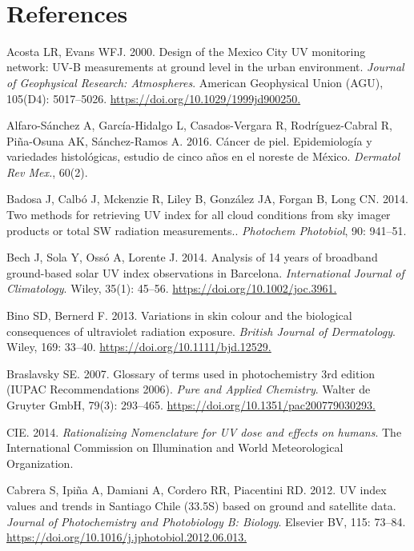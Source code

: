 \documentclass[10pt]{article}
\begin{document}
~

\FloatBarrier
\section*{References}\sloppy
{}
\label{csl:18}Acosta LR, Evans WFJ. 2000. {Design of the Mexico City {UV} monitoring network: {UV}-B measurements at ground level in the urban environment}. \textit{Journal of Geophysical Research: Atmospheres}. American Geophysical Union ({AGU}), 105(D4): 5017–5026. \url{https://doi.org/10.1029/1999jd900250.}

\label{csl:74}Alfaro-Sánchez A, García-Hidalgo L, Casados-Vergara R, Rodríguez-Cabral R, Piña-Osuna AK, Sánchez-Ramos A. 2016. {Cáncer de piel. Epidemiología y variedades histológicas, estudio de cinco años en el noreste de México}. \textit{Dermatol Rev Mex.}, 60(2).

\label{csl:69}Badosa J, Calbó J, Mckenzie R, Liley B, González JA, Forgan B, Long CN. 2014. {Two methods for retrieving UV index for all cloud conditions from sky imager products or total SW radiation measurements.}. \textit{Photochem Photobiol}, 90: 941–51.

\label{csl:59}Bech J, Sola Y, Oss{\'{o}} A, Lorente J. 2014. {Analysis of 14 years of broadband ground-based solar {UV} index observations in Barcelona}. \textit{International Journal of Climatology}. Wiley, 35(1): 45–56. \url{https://doi.org/10.1002/joc.3961.}

\label{csl:43}Bino SD, Bernerd F. 2013. {Variations in skin colour and the biological consequences of ultraviolet radiation exposure}. \textit{British Journal of Dermatology}. Wiley, 169: 33–40. \url{https://doi.org/10.1111/bjd.12529.}

\label{csl:29}Braslavsky SE. 2007. {Glossary of terms used in photochemistry 3rd edition ({IUPAC} Recommendations 2006)}. \textit{Pure and Applied Chemistry}. Walter de Gruyter {GmbH}, 79(3): 293–465. \url{https://doi.org/10.1351/pac200779030293.}

\label{csl:23}CIE. 2014. \textit{{Rationalizing Nomenclature for UV dose and effects on humans}}. The International Commission on Illumination and World Meteorological Organization.

\label{csl:71}Cabrera S, Ipi{\~{n}}a A, Damiani A, Cordero RR, Piacentini RD. 2012. {{UV} index values and trends in Santiago Chile (33.5{\textdegree}S) based on ground and satellite data}. \textit{Journal of Photochemistry and Photobiology B: Biology}. Elsevier {BV}, 115: 73–84. \url{https://doi.org/10.1016/j.jphotobiol.2012.06.013.}
\end{document}
